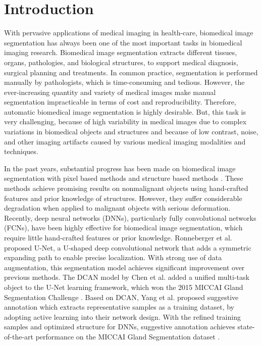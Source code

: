 \documentclass[10pt,twocolumn,letterpaper]{article}
\begin{document}
\vspace{-10pt}
\section{Introduction}



With pervasive applications of medical imaging in health-care, biomedical image segmentation has always been one of the most important tasks in biomedical imaging research.
Biomedical image segmentation extracts different tissues, organs, pathologies, and biological structures, to support medical diagnosis, surgical planning and treatments.
In common practice, segmentation is performed manually by pathologists, which is time-consuming and tedious.
However, the ever-increasing quantity and variety of medical images make manual segmentation impracticable in terms of cost and reproducibility.
Therefore, automatic biomedical image segmentation is highly desirable.
But, this task is very challenging,
because of high variability in medical images due to complex variations in biomedical objects and structures and because of low contrast, noise, and other imaging artifacts caused by various medical imaging modalities and techniques.



In the past years, substantial progress has been made on biomedical image segmentation with pixel based methods \cite{doyle2006boosting,nguyen2012structure,tabesh2007multifeature,sirinukunwattana2015novel} and structure based methods \cite{altunbay2010color,gunduz2010automatic,fu2014novel,sirinukunwattana2015stochastic}.
These methods achieve promising results on nonmalignant objects using hand-crafted features and prior knowledge of structures.
However, they suffer considerable degradation when applied to malignant objects with serious deformation.
Recently, deep neural networks (DNNs), particularly fully convolutional networks (FCNs), have been highly effective for biomedical image segmentation, which require little hand-crafted features or prior knowledge.
Ronneberger et al. \cite{ronneberger2015u} proposed U-Net, a U-shaped deep convolutional network that adds a symmetric expanding path to enable precise localization.
With strong use of data augmentation, this segmentation model achieves significant improvement over previous methods.
The DCAN model by Chen et al. \cite{chen2016deep,chen2016dcan} added a unified multi-task object to the U-Net learning framework, which won the 2015 MICCAI Gland Segmentation Challenge \cite{sirinukunwattana2017gland}.
Based on DCAN, Yang et al. \cite{yang2017suggestive} proposed suggestive annotation which extracts representative samples as a training dataset, by adopting active learning into their network design.
With the refined training samples and optimized structure for DNNs, suggestive annotation achieves state-of-the-art performance on the MICCAI Gland Segmentation dataset \cite{sirinukunwattana2017gland}.
\end{document}
